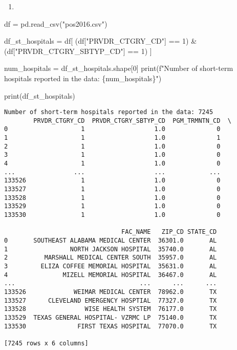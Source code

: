 \documentclass[
  letterpaper,
  DIV=11,
  numbers=noendperiod]{scrartcl}
\newenvironment{Shaded}{\begin{snugshade}}{\end{snugshade}}
\newcommand{\BuiltInTok}[1]{\textcolor[rgb]{0.00,0.23,0.31}{#1}}
\newcommand{\DecValTok}[1]{\textcolor[rgb]{0.68,0.00,0.00}{#1}}
\newcommand{\NormalTok}[1]{\textcolor[rgb]{0.00,0.23,0.31}{#1}}
\newcommand{\OperatorTok}[1]{\textcolor[rgb]{0.37,0.37,0.37}{#1}}
\newcommand{\SpecialCharTok}[1]{\textcolor[rgb]{0.37,0.37,0.37}{#1}}
\newcommand{\SpecialStringTok}[1]{\textcolor[rgb]{0.13,0.47,0.30}{#1}}
\newcommand{\StringTok}[1]{\textcolor[rgb]{0.13,0.47,0.30}{#1}}
\providecommand{\tightlist}{%
  \setlength{\itemsep}{0pt}\setlength{\parskip}{0pt}}\usepackage{longtable,booktabs,array}
\begin{document}
\begin{enumerate}
\def\labelenumi{\arabic{enumi}.}
\setcounter{enumi}{1}
\tightlist
\item
\end{enumerate}

\begin{Shaded}
\begin{Highlighting}[]
\NormalTok{df }\OperatorTok{=}\NormalTok{ pd.read\_csv(}\StringTok{"pos2016.csv"}\NormalTok{)}


\NormalTok{df\_st\_hospitals }\OperatorTok{=}\NormalTok{ df[}
\NormalTok{    (df[}\StringTok{"PRVDR\_CTGRY\_CD"}\NormalTok{] }\OperatorTok{==} \DecValTok{1}\NormalTok{) }\OperatorTok{\&} 
\NormalTok{    (df[}\StringTok{"PRVDR\_CTGRY\_SBTYP\_CD"}\NormalTok{] }\OperatorTok{==} \DecValTok{1}\NormalTok{)}
\NormalTok{]}

\NormalTok{num\_hospitals }\OperatorTok{=}\NormalTok{ df\_st\_hospitals.shape[}\DecValTok{0}\NormalTok{]}
\BuiltInTok{print}\NormalTok{(}\SpecialStringTok{f"Number of short{-}term hospitals reported in the data: }\SpecialCharTok{\{}\NormalTok{num\_hospitals}\SpecialCharTok{\}}\SpecialStringTok{"}\NormalTok{)}

\BuiltInTok{print}\NormalTok{(df\_st\_hospitals)}
\end{Highlighting}
\end{Shaded}

\begin{verbatim}
Number of short-term hospitals reported in the data: 7245
        PRVDR_CTGRY_CD  PRVDR_CTGRY_SBTYP_CD  PGM_TRMNTN_CD  \
0                    1                   1.0              0   
1                    1                   1.0              1   
2                    1                   1.0              0   
3                    1                   1.0              0   
4                    1                   1.0              0   
...                ...                   ...            ...   
133526               1                   1.0              0   
133527               1                   1.0              0   
133528               1                   1.0              0   
133529               1                   1.0              0   
133530               1                   1.0              0   

                                FAC_NAME   ZIP_CD STATE_CD  
0       SOUTHEAST ALABAMA MEDICAL CENTER  36301.0       AL  
1                 NORTH JACKSON HOSPITAL  35740.0       AL  
2          MARSHALL MEDICAL CENTER SOUTH  35957.0       AL  
3         ELIZA COFFEE MEMORIAL HOSPITAL  35631.0       AL  
4               MIZELL MEMORIAL HOSPITAL  36467.0       AL  
...                                  ...      ...      ...  
133526             WEIMAR MEDICAL CENTER  78962.0       TX  
133527      CLEVELAND EMERGENCY HOSPTIAL  77327.0       TX  
133528                WISE HEALTH SYSTEM  76177.0       TX  
133529  TEXAS GENERAL HOSPITAL- VZRMC LP  75140.0       TX  
133530              FIRST TEXAS HOSPITAL  77070.0       TX  

[7245 rows x 6 columns]
\end{verbatim}
\end{document}
